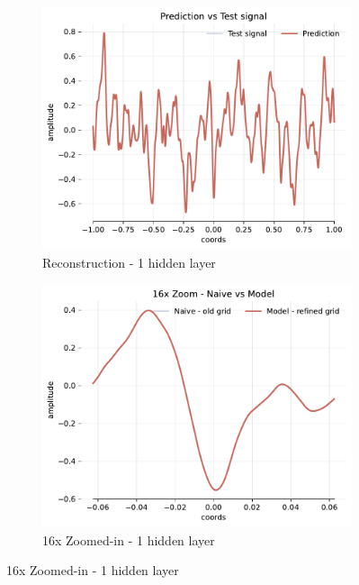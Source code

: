 \begin{figure}[!h]
    \begin{subfigure}[b]{0.32\textwidth}
        \centering
        \includegraphics[width=\textwidth]{img/ch3/pred-64hf-1hl-32w-filter3.pdf}
        \caption{Reconstruction - 1 hidden layer}
    \end{subfigure}
    \begin{subfigure}[b]{0.32\textwidth}
        \centering
        \includegraphics[width=\textwidth]{img/ch3/16x-64hf-1hl-32w-filter3.pdf}
        \caption{16x Zoomed-in - 1 hidden layer}
    \end{subfigure}

\end{figure}
